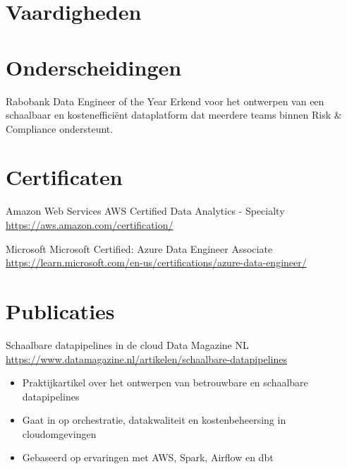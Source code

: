 \documentclass[a4paper, serif, 10pt]{moderncv}
\begin{document}
\section{Vaardigheden}

\section{Onderscheidingen}

        {Rabobank}
        {Data Engineer of the Year}
        {}
        {}
        {Erkend voor het ontwerpen van een schaalbaar en kostenefficiënt dataplatform dat meerdere teams binnen Risk \& Compliance ondersteunt.}
\section{Certificaten}

        {Amazon Web Services}
        {AWS Certified Data Analytics - Specialty}
        {\url{https://aws.amazon.com/certification/}}
        {}
        {}

        {Microsoft}
        {Microsoft Certified: Azure Data Engineer Associate}
        {\url{https://learn.microsoft.com/en-us/certifications/azure-data-engineer/}}
        {}
        {}
\section{Publicaties}

        {Schaalbare datapipelines in de cloud}
        {Data Magazine NL}
        {\url{https://www.datamagazine.nl/artikelen/schaalbare-datapipelines}}
        {}
        {\begin{itemize}
\item Praktijkartikel over het ontwerpen van betrouwbare en schaalbare datapipelines
\item Gaat in op orchestratie, datakwaliteit en kostenbeheersing in cloudomgevingen
\item Gebaseerd op ervaringen met AWS, Spark, Airflow en dbt
\end{itemize}}
\end{document}
